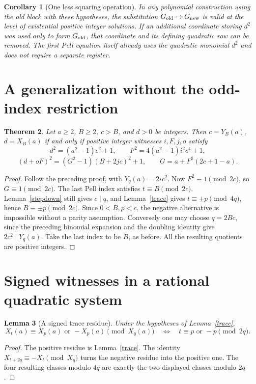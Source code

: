 \documentclass[11pt]{article}
\newtheorem{theorem}{Theorem}
\newtheorem{lemma}[theorem]{Lemma}
\newtheorem{corollary}[theorem]{Corollary}
\begin{document}
\begin{corollary}[One less squaring operation]
In any polynomial construction using the old block with these
hypotheses, the substitution \(G_{\rm old}\mapsto G_{\rm new}\)
is valid at the level of existential positive integer solutions.
If an additional coordinate storing \(d^2\) was used only to form
\(G_{\rm old}\), that coordinate and its defining quadratic row
can be removed.  The first Pell equation itself already uses the
quadratic monomial \(d^2\) and does not require a separate register.
\end{corollary}

\section{A generalization without the odd-index restriction}

\begin{theorem}\label{arbitrary}
Let \(a\ge2\), \(B\ge2\), \(c>B\), and \(d>0\) be integers.
Then \(c=Y_B(a)\), \(d=X_B(a)\) if and only if positive integer
witnesses \(i,F,j,o\) satisfy
\[
 d^2=(a^2-1)c^2+1,
 \qquad F^2=4(a^2-1)i^2c^4+1,
\]
\[
 (d+oF)^2=(G^2-1)(B+2jc)^2+1,
 \qquad G=a+F^2(2c+1-a).
\]
\end{theorem}
\begin{proof}
Follow the preceding proof, with \(Y_q(a)=2ic^2\).
Now \(F^2\equiv1\pmod {2c}\), so \(G\equiv1\pmod {2c}\).
The last Pell index satisfies \(t\equiv B\pmod {2c}\).
Lemma~\ref{stepdown} still gives \(c\mid q\), and
Lemma~\ref{trace} gives \(t\equiv\pm p\pmod {4q}\), hence
\(B\equiv\pm p\pmod {2c}\).
Since \(0<B,p<c\), the negative alternative is impossible
without a parity assumption.  Conversely one may choose \(q=2Bc\),
since the preceding binomial expansion and the doubling identity give
\(2c^2\mid Y_q(a)\).  Take the last index to be \(B\),
as before.  All the resulting quotients are positive integers.
\end{proof}

\section{Signed witnesses in a rational quadratic system}

\begin{lemma}[A signed trace residue]\label{signedtrace}
Under the hypotheses of Lemma~\ref{trace},
\[
 X_t(a)\equiv X_p(a)\text{ or }-X_p(a)\pmod {X_q(a)}
 \quad\Longleftrightarrow\quad
 t\equiv p\text{ or }-p\pmod {2q}.
\]
\end{lemma}
\begin{proof}
The positive residue is Lemma~\ref{trace}.  The identity
\(X_{t+2q}\equiv-X_t\pmod {X_q}\) turns the negative residue
into the positive one.  The four resulting classes modulo \(4q\)
are exactly the two displayed classes modulo \(2q\).
\end{proof}
\end{document}
